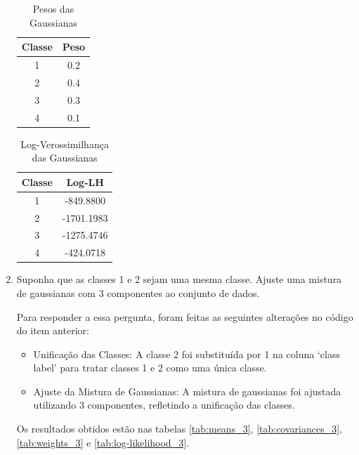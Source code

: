 \begin{enumerate}
\begin{table}[H]
    \centering
    \caption{Pesos das Gaussianas}
    \begin{tabular}{|c|c|}
        \hline
        Classe & Peso \\ \hline
        1 & 0.2 \\ \hline
        2 & 0.4 \\ \hline
        3 & 0.3 \\ \hline
        4 & 0.1 \\ \hline
    \end{tabular}
    \label{tab:weights}
\end{table}

\begin{table}[H]
    \centering
    \caption{Log-Verossimilhança das Gaussianas}
    \begin{tabular}{|c|c|}
        \hline
        Classe & Log-LH \\ \hline
        1 & -849.8800 \\ \hline
        2 & -1701.1983 \\ \hline
        3 & -1275.4746 \\ \hline
        4 & -424.0718 \\ \hline
    \end{tabular}
    \label{tab:log-likelihood}
\end{table}

\newpage 
\item Suponha que as classes 1 e 2 sejam uma mesma classe. Ajuste uma mistura de gaussianas com 3 componentes ao conjunto de dados.

\begin{tcolorbox}[colback=white, colframe=black, title=Resposta:]
Para responder a essa pergunta, foram feitas as seguintes alterações no código do item anterior:
    \begin{itemize}
        \item Unificação das Classes: A classe 2 foi substituída por 1 na coluna `class label' para tratar classes 1 e 2 como uma única classe.
        \item Ajuste da Mistura de Gaussianas: A mistura de gaussianas foi ajustada utilizando 3 componentes, refletindo a unificação das classes.
    \end{itemize}
Os resultados obtidos estão nas tabelas \ref{tab:means_3}, \ref{tab:covariances_3}, \ref{tab:weights_3} e \ref{tab:log-likelihood_3}.
\end{tcolorbox}


\end{enumerate}
